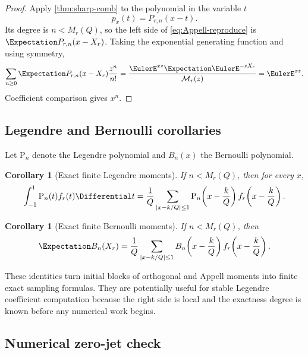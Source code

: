 \documentclass[11pt,oneside]{article}
\newtheorem{corollary}[theorem]{Corollary}
\theoremstyle{definition}
\theoremstyle{remark}
\newcommand{\Mr}{\mathcal M}
\begin{document}
\begin{proof}
Apply \cref{thm:sharp-comb} to the polynomial in the variable $t$
\[
 p_x(t)=P_{r,n}(x-t).
\]
Its degree is $n<M_r(Q)$, so the left side of \eqref{eq:Appell-reproduce}
is $\Expectation P_{r,n}(x-X_r)$.  Taking the exponential generating function and using
symmetry,
\[
 \sum_{n\geq0}\Expectation P_{r,n}(x-X_r)\frac{z^n}{n!}
 =\frac{\EulerE^{xz}\Expectation\EulerE^{-zX_r}}{\Mr_r(z)}
 =\EulerE^{xz}.
\]
Coefficient comparison gives $x^n$.
\end{proof}

\subsection{Legendre and Bernoulli corollaries}

Let $\mathrm P_n$ denote the Legendre polynomial and $B_n(x)$ the Bernoulli
polynomial.

\begin{corollary}[Exact finite Legendre moments]\label{cor:Legendre-comb}
If $n<M_r(Q)$, then for every $x$,
\begin{equation}\label{eq:Legendre-comb}
 \int_{-1}^{1}\mathrm P_n(t)f_r(t)\Differential t
 =\frac1Q\sum_{|x-k/Q|\leq1}
 \mathrm P_n\!\left(x-\frac{k}{Q}\right)
 f_r\!\left(x-\frac{k}{Q}\right).
\end{equation}
\end{corollary}

\begin{corollary}[Exact finite Bernoulli moments]\label{cor:Bernoulli-comb}
If $n<M_r(Q)$, then
\begin{equation}\label{eq:Bernoulli-comb}
 \Expectation B_n(X_r)
 =\frac1Q\sum_{|x-k/Q|\leq1}
 B_n\!\left(x-\frac{k}{Q}\right)
 f_r\!\left(x-\frac{k}{Q}\right).
\end{equation}
\end{corollary}

These identities turn initial blocks of orthogonal and Appell moments into
finite exact sampling formulas.  They are potentially useful for stable
Legendre coefficient computation because the right side is local and the
exactness degree is known before any numerical work begins.

\subsection{Numerical zero-jet check}
\end{document}
